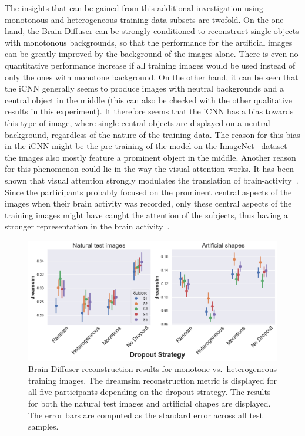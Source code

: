 The insights that can be gained from this additional investigation using monotonous and heterogeneous training data subsets are twofold. On the one hand, the Brain-Diffuser can be strongly conditioned to reconstruct single objects with monotonous backgrounds, so that the performance for the artificial images can be greatly improved by the background of the images alone. There is even no quantitative performance increase if all training images would be used instead of only the ones with monotone background. On the other hand, it can be seen that the iCNN generally seems to produce images with neutral backgrounds and a central object in the middle (this can also be checked with the other qualitative results in this experiment). It therefore seems that the iCNN has a bias towards this type of image, where single central objects are displayed on a neutral background, regardless of the nature of the training data. The reason for this bias in the iCNN might be the pre-training of the model on the ImageNet~\cite{dengImageNetLargescaleHierarchical2009} dataset --- the images also mostly feature a prominent object in the middle. Another reason for this phenomenon could lie in the way the visual attention works. It has been shown that visual attention strongly modulates the translation of brain-activity~\cite{horikawaAttentionModulatesNeural2022}. Since the participants probably focused on the prominent central aspects of the images when their brain activity was recorded, only these central aspects of the training images might have caught the attention of the subjects, thus having a stronger representation in the brain activity~\cite{wolfeVisualAttention2000}. 

\begin{figure}[ht]
  \centering
  \includegraphics[width=1\textwidth]{plots/dropout_discussion_reconstruction_bd.png}
  \caption[Brain-Diffuser reconstruction performance monotone vs.\ heterogeneous training sample]{Brain-Diffuser reconstruction results for monotone vs.\ heterogeneous training images. The dreamsim reconstruction metric is displayed for all five participants depending on the dropout strategy. The results for both the natural test images and artificial chapes are displayed. The error bars are computed as the standard error across all test samples.}\label{fig:dropout_discussion_reconstruction_bd}
\end{figure}

